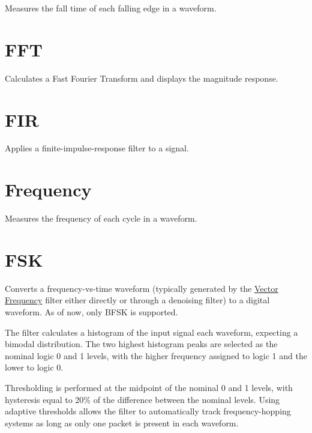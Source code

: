 Measures the fall time of each falling edge in a waveform.

\pagebreak
\section{FFT}

Calculates a Fast Fourier Transform and displays the magnitude response.

\pagebreak
\section{FIR}

Applies a finite-impulse-response filter to a signal.

\pagebreak
\section{Frequency}

Measures the frequency of each cycle in a waveform.

\pagebreak
\section{FSK}

Converts a frequency-vs-time waveform (typically generated by the \hyperref[filter:vector_frequency]{Vector Frequency}
filter either directly or through a denoising filter) to a digital waveform. As of now, only BFSK is supported.

The filter calculates a histogram of the input signal each waveform, expecting a bimodal distribution. The two highest
histogram peaks are selected as the nominal logic 0 and 1 levels, with the higher frequency assigned to logic 1 and the
lower to logic 0.

Thresholding is performed at the midpoint of the nominal 0 and 1 levels, with hysteresis equal to 20\% of the
difference between the nominal levels. Using adaptive thresholds allows the filter to automatically track
frequency-hopping systems as long as only one packet is present in each waveform.

